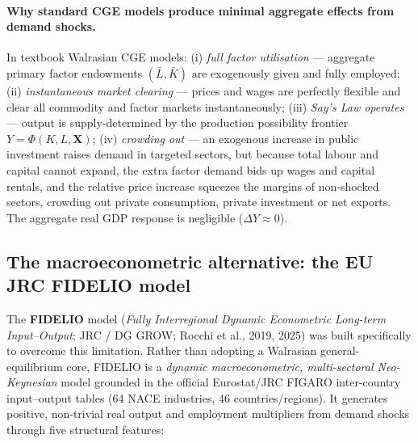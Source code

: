 \paragraph{Why standard CGE models produce minimal aggregate effects from demand shocks.}
In textbook Walrasian CGE models: (i) \emph{full factor utilisation} ---
aggregate primary factor endowments $(\bar L, \bar K)$ are exogenously given
and fully employed; (ii) \emph{instantaneous market clearing} --- prices and
wages are perfectly flexible and clear all commodity and factor markets
instantaneously; (iii) \emph{Say's Law operates} --- output is
supply-determined by the production possibility frontier
$Y = \Phi(K, L, \mathbf{X})$; (iv) \emph{crowding out} --- an exogenous increase
in public investment raises demand in targeted sectors, but because total
labour and capital cannot expand, the extra factor demand bids up wages and
capital rentals, and the relative price increase squeezes the margins of
non-shocked sectors, crowding out private consumption, private investment or
net exports. The aggregate real GDP response is negligible
($\Delta Y \approx 0$).

\subsection{The macroeconometric alternative: the EU JRC FIDELIO model}\label{app:fidelio}

The \textbf{FIDELIO} model (\emph{Fully Interregional Dynamic Econometric
Long-term Input--Output}; JRC / DG GROW; Rocchi et al., 2019, 2025) was built
specifically to overcome this limitation. Rather than adopting a Walrasian
general-equilibrium core, FIDELIO is a \emph{dynamic macroeconometric,
multi-sectoral Neo-Keynesian} model grounded in the official Eurostat/JRC
FIGARO inter-country input--output tables (64 NACE industries, 46
countries/regions). It generates positive, non-trivial real output and
employment multipliers from demand shocks through five structural features:

